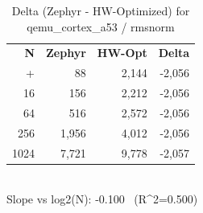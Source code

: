 \begin{table}[tb]
    \centering
    \caption{Delta (Zephyr - HW-Optimized) for qemu_cortex_a53 / rmsnorm}
    \label{tab:delta_qemu_cortex_a53_rmsnorm}
    \scriptsize
    \begin{tabular}{r r r r}
        \hline
        \textbf{N} & \textbf{Zephyr} & \textbf{HW-Opt} & \textbf{Delta} \\\n+        \hline
        4 & 88 & 2,144 & -2,056\\
        16 & 156 & 2,212 & -2,056\\
        64 & 516 & 2,572 & -2,056\\
        256 & 1,956 & 4,012 & -2,056\\
        1024 & 7,721 & 9,778 & -2,057\\
        \hline
    \end{tabular}
    \vspace{2mm}\\\n    Slope vs log2(N): -0.100 \ (R^2=0.500)\n\end{table}
